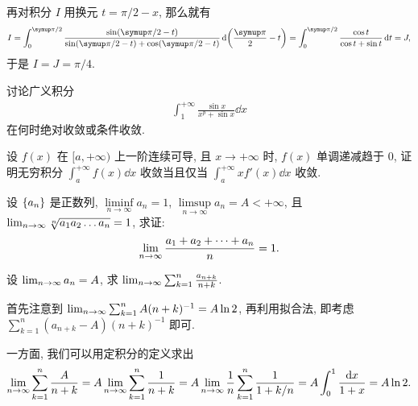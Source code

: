 \documentclass{ctexart}
\begin{document}
\begin{exercise}[series=exer]
\begin{answer}
        再对积分 $ I $ 用换元 $ t = \pi/2 - x $, 那么就有
        \begin{align*}
            I = \int_{0}^{\pi/2} \frac{\sin(\pi/2 - t)}{\sin(\pi/2 - t) + \cos(\pi/2 - t)} \dd{\qty(\frac{\pi}{2} - t)} = \int_{0}^{\pi/2} \frac{\cos t}{\cos t + \sin t} \dd{t} = J,
        \end{align*}
        于是 $ I = J = \pi/4 $. 
    \end{answer}
    \item 讨论广义积分
    \begin{align*}
        \int_{1}^{+\infty} \frac{\sin x}{x^{p} + \sin x} \dd{x}
    \end{align*}
    在何时绝对收敛或条件收敛.
    \item 设 $ f(x) $ 在 $ [a, +\infty) $ 上一阶连续可导, 且 $ x \to +\infty $ 时, $ f(x) $ 单调递减趋于 $ 0 $, 证明无穷积分 $ \int_{a}^{+\infty} f(x) \dd{x} $ 收敛当且仅当 $ \int_{a}^{+\infty} xf'(x) \dd{x} $ 收敛. 
    \item 设 $ \qty{a_{n}} $ 是正数列, $ \liminf\limits_{n\to\infty} a_{n} = 1 $, $ \limsup\limits_{n\to\infty} a_{n} = A < +\infty $, 且 $ \lim_{n \to \infty} \sqrt[n]{a_{1}a_{2}\dots a_{n}} = 1 $, 求证:
    \begin{align*}
        \lim_{n \to \infty}\frac{a_{1} + a_{2} + \dots + a_{n}}{n} = 1.
    \end{align*}
    \item 设 $ \lim_{n \to \infty} a_{n} = A $, 求 $ \lim_{n \to \infty} \sum_{k=1}^{n} \frac{a_{n+k}}{n+k} $.  
    \begin{hint}
        首先注意到 $ \lim_{n \to \infty}\sum_{k = 1}^{n} A(n + k)^{-1} = A\ln 2 $, 再利用拟合法, 即考虑 $ \sum_{k = 1}^{n} (a_{n + k} - A)(n + k)^{-1} $ 即可. 
    \end{hint}
    \begin{answer}
        一方面, 我们可以用定积分的定义求出
        \begin{align*}
            \lim_{n \to \infty}\sum_{k = 1}^{n}\frac{A}{n + k} = A \lim_{n \to \infty}\sum_{k = 1}^{n} \frac{1}{n + k} = A \lim_{n \to \infty}\frac{1}{n} \sum_{k = 1}^{n}\frac{1}{1 + k/n} = A\int_{0}^{1} \frac{\dd x}{1 + x} = A\ln 2.
        \end{align*}
        

\end{answer}
\end{exercise}
\end{document}
